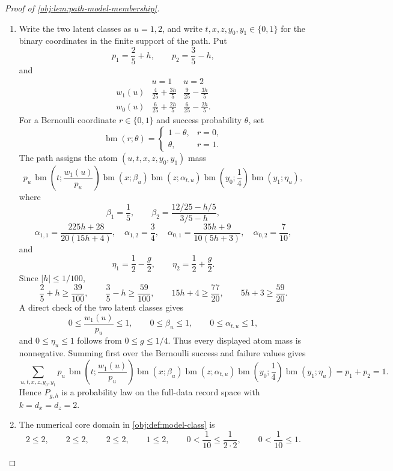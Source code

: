 \documentclass[11pt]{article}
\begin{document}
\begin{proof}[Proof of \cref{obj:lem:path-model-membership}]
\begin{enumerate}
\item Write the two latent classes as \(u=1,2\), and write \(t,x,z,y_0,y_1\in\{0,1\}\) for the binary coordinates in the finite support of the path.  Put
\[
p_1=\frac25+h,\qquad p_2=\frac35-h,
\]
and
\[
\begin{array}{c|cc}
&u=1&u=2\\ \hline
w_1(u)&\frac4{25}+\frac{3h}{5}&\frac9{25}-\frac{3h}{5}\\[0.25em]
w_0(u)&\frac6{25}+\frac{2h}{5}&\frac6{25}-\frac{2h}{5}.
\end{array}
\]
For a Bernoulli coordinate \(r\in\{0,1\}\) and success probability \(\theta\), set
\[
\operatorname{bm}(r;\theta)
=
\begin{cases}
1-\theta,& r=0,\\
\theta,& r=1.
\end{cases}
\]
The path assigns the atom \((u,t,x,z,y_0,y_1)\) mass
\[
p_u\,
\operatorname{bm}\!\left(t;\frac{w_1(u)}{p_u}\right)
\operatorname{bm}(x;\beta_u)
\operatorname{bm}(z;\alpha_{t,u})
\operatorname{bm}\!\left(y_0;\frac14\right)
\operatorname{bm}(y_1;\eta_u),
\]
where
\[
\beta_1=\frac15,\qquad
\beta_2=\frac{12/25-h/5}{3/5-h},
\]
\[
\alpha_{1,1}=\frac{225h+28}{20(15h+4)},\quad
\alpha_{1,2}=\frac34,\quad
\alpha_{0,1}=\frac{35h+9}{10(5h+3)},\quad
\alpha_{0,2}=\frac7{10},
\]
and
\[
\eta_1=\frac12-\frac g2,\qquad \eta_2=\frac12+\frac g2 .
\]
Since \(|h|\le 1/100\),
\[
\frac25+h\ge\frac{39}{100},\qquad
\frac35-h\ge\frac{59}{100},\qquad
15h+4\ge\frac{77}{20},\qquad
5h+3\ge\frac{59}{20}.
\]
A direct check of the two latent classes gives
\[
0\le \frac{w_1(u)}{p_u}\le1,\qquad
0\le \beta_u\le1,\qquad
0\le \alpha_{t,u}\le1,
\]
and \(0\le\eta_u\le1\) follows from \(0\le g\le1/4\).  Thus every displayed atom mass is nonnegative.  Summing first over the Bernoulli success and failure values gives
\[
\sum_{u,t,x,z,y_0,y_1}
p_u\,
\operatorname{bm}\!\left(t;\frac{w_1(u)}{p_u}\right)
\operatorname{bm}(x;\beta_u)
\operatorname{bm}(z;\alpha_{t,u})
\operatorname{bm}\!\left(y_0;\frac14\right)
\operatorname{bm}(y_1;\eta_u)
=
p_1+p_2=1 .
\]
Hence \(P_{g,h}\) is a probability law on the full-data record space with \(k=d_x=d_z=2\). %

\item The numerical core domain in \cref{obj:def:model-class} is
\[
2\le2,\qquad 2\le2,\qquad 2\le2,\qquad 1\le2,\qquad
0<\frac1{10}\le\frac1{2\cdot2},\qquad
0<\frac1{10}\le1 .
\]


\end{enumerate}
\end{proof}
\end{document}
